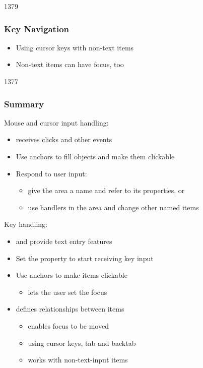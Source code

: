 \begin{slide}{1379}\frametitle{Key Navigation}

\vspace{20mm}
\vspace{-20mm}

\begin{itemize}
\item Using cursor keys with non-text items
\item Non-text items can have focus, too
\end{itemize}

\end{slide}


\begin{slide}{1377}\frametitle{Summary}

Mouse and cursor input handling:

\begin{itemize}
\item {} receives clicks and other events
\item Use anchors to fill objects and make them clickable
\item Respond to user input:
  \begin{itemize}
  \item give the area a name and refer to its properties, or
  \item use handlers in the area and change other named items
  \end{itemize}
\end{itemize}

Key handling:

\begin{itemize}
\item {} and  provide text entry features
\item Set the  property to start receiving key input
\item Use anchors to make items clickable
  \begin{itemize}
  \item lets the user set the focus
  \end{itemize}
\item {} defines relationships between items
  \begin{itemize}
  \item enables focus to be moved
  \item using cursor keys, tab and backtab
  \item works with non-text-input items
  \end{itemize}
\end{itemize}

\end{slide}       


